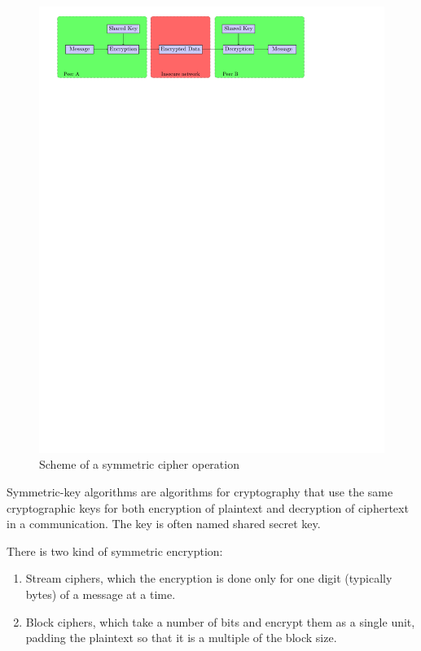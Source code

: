 \begin{figure}[!ht]
\centering
\includegraphics[trim=1cm 23.25cm 4cm 0cm]{figures/sym_cipher.pdf}
\caption{Scheme of a symmetric cipher operation}
\label{fig:sym}

\end{figure}

Symmetric-key algorithms are algorithms for cryptography that use the same
cryptographic keys for both encryption of plaintext and decryption of
ciphertext in a communication.\newline
The key is often named shared secret key.\newline

There is two kind of symmetric encryption:
\begin{enumerate}
  \item Stream ciphers, which the encryption is done only for one digit
  (typically bytes) of a message at a time.
  \item Block ciphers, which take a number of bits and encrypt them as a single
  unit, padding the plaintext so that it is a multiple of the block
  size.\newline
\end{enumerate}

